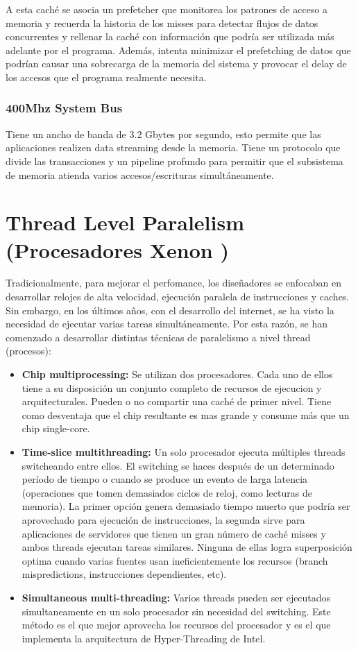 A esta caché se asocia un prefetcher que monitorea los patrones de acceso a memoria y recuerda la historia de los misses para detectar flujos de datos concurrentes y rellenar la caché con información que podría ser utilizada más adelante por el programa. Además, intenta minimizar el prefetching de datos que podrían causar una sobrecarga de la memoria del sistema y provocar el delay de los accesos que el programa realmente necesita.

\subsubsection*{400Mhz System Bus}
Tiene un ancho de banda de 3.2 Gbytes por segundo, esto permite que las aplicaciones realizen data streaming desde la memoria. Tiene un protocolo que divide las transacciones y un pipeline profundo para permitir que el subsistema de memoria atienda varios accesos/escrituras simultáneamente. 

\newpage
\section{Thread Level Paralelism (Procesadores Xenon \cite{marr02threads})}

Tradicionalmente, para mejorar el perfomance, los diseñadores se enfocaban en desarrollar relojes de alta velocidad, ejecución paralela de instrucciones y caches. Sin embargo, en los últimos años, con el desarrollo del internet, se ha visto la necesidad de ejecutar varias tareas simultáneamente. Por esta razón, se han comenzado a desarrollar distintas técnicas de paralelismo a nivel thread (procesos):

\begin{itemize}
	\item \textbf{Chip multiprocessing:}
	 Se utilizan dos procesadores. Cada uno de ellos tiene a su disposición un conjunto completo de recursos de ejecucion y arquitecturales. Pueden o no compartir una caché de primer nivel. Tiene como desventaja que el chip resultante es mas grande y consume más que un chip single-core.
	\item\textbf{Time-slice multithreading:} Un solo procesador ejecuta múltiples threads switcheando entre ellos. El switching se haces después de un determinado período de tiempo o cuando se produce un evento de larga latencia (operaciones que tomen demasiados ciclos de reloj, como lecturas de memoria). La primer opción genera demasiado tiempo muerto que podría ser aprovechado para ejecución de instrucciones, la segunda sirve para aplicaciones de servidores que tienen un gran número de caché misses y ambos threads ejecutan tareas similares. Ninguna de ellas logra superposición optima cuando varias fuentes usan ineficientemente los recursos (branch mispredictions, instrucciones dependientes, etc).
	\item \textbf{Simultaneous multi-threading:} Varios threads pueden ser ejecutados simultaneamente en un solo procesador sin necesidad del switching. Este método es el que mejor aprovecha los recursos del procesador y es el que implementa la arquitectura de Hyper-Threading de Intel.
\end{itemize}

